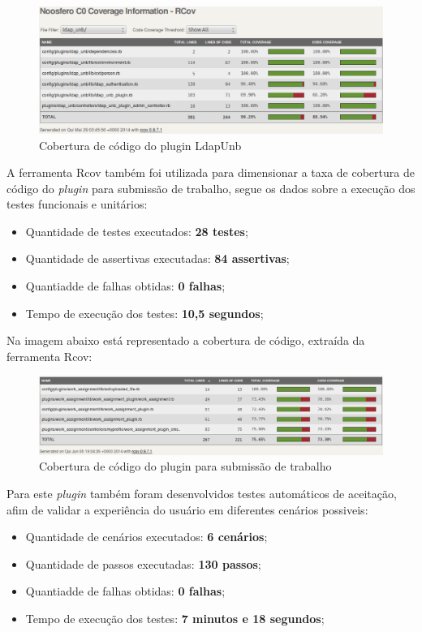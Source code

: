 %
\begin{figure}[!h]
    \centering
    \includegraphics[keepaspectratio=false,scale=0.45]
      {figuras/cobertura_teste.eps}
    \caption{Cobertura de código do plugin LdapUnb}
    \label{consideracoes_cobertura1}
\end{figure}
%


A ferramenta Rcov também foi utilizada para dimensionar a taxa de cobertura de código do \textit{plugin} para submissão de trabalho, segue os dados sobre a execução dos testes funcionais e unitários:
\begin{itemize}
\item Quantidade de testes executados: \textbf{28 testes};
\item Quantidade de assertivas executadas: \textbf{84 assertivas};
\item Quantiadde de falhas obtidas: \textbf{0 falhas};
\item Tempo de execução dos testes: \textbf{10,5 segundos};
\end{itemize}

Na imagem abaixo está representado a cobertura de código, extraída da ferramenta Rcov:

\begin{figure}[!h]
    \centering
    \includegraphics[keepaspectratio=false,scale=0.45]
      {figuras/cobertura_tcc.eps}
    \caption{Cobertura de código do plugin para submissão de trabalho}
    \label{consideracoes_cobertura2}
\end{figure}

Para este \textit{plugin} também foram desenvolvidos testes automáticos de aceitação, afim de validar a experiência do usuário em diferentes cenários possiveis:
\begin{itemize}
\item Quantidade de cenários executados: \textbf{6 cenários};
\item Quantidade de passos executadas: \textbf{130 passos};
\item Quantiadde de falhas obtidas: \textbf{0 falhas};
\item Tempo de execução dos testes: \textbf{7 minutos e 18 segundos};
\end{itemize}

